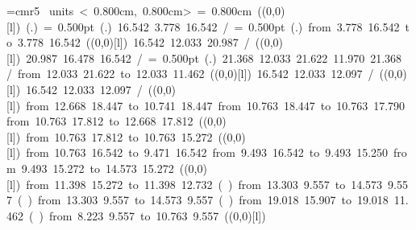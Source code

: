 \font\thinlinefont=cmr5
\mbox{\beginpicture
\setcoordinatesystem units < 0.800cm, 0.800cm>
\unitlength= 0.800cm
\linethickness=1pt
\setplotsymbol ({\makebox(0,0)[l]{\tencirc{}}})
\setshadesymbol ({\thinlinefont .})
\setlinear
%
%
\linethickness= 0.500pt
\setplotsymbol ({\thinlinefont .})
 16.542  3.778 16.542 /
%
%
\linethickness= 0.500pt
\setplotsymbol ({\thinlinefont .})
\putrule from  3.778 16.542 to  3.778 16.542
%
%
\linethickness=1pt
\setplotsymbol ({\makebox(0,0)[l]{\tencirc{}}})
 16.542 12.033 20.987 /
%
%
\linethickness=1pt
\setplotsymbol ({\makebox(0,0)[l]{\tencirc{}}})
 20.987 16.478 16.542 /
%
%
\linethickness= 0.500pt
\setplotsymbol ({\thinlinefont .})
%
%
 21.368 12.033 21.622 11.970 21.368 /
%
\putrule from 12.033 21.622 to 12.033 11.462
%
%
\linethickness=1pt
\setplotsymbol ({\makebox(0,0)[l]{\tencirc{}}})
 16.542 12.033 12.097 /
%
%
\linethickness=1pt
\setplotsymbol ({\makebox(0,0)[l]{\tencirc{}}})
 16.542 12.033 12.097 /
%
%
\linethickness=1pt
\setplotsymbol ({\makebox(0,0)[l]{\tencirc{}}})
\putrule from 12.668 18.447 to 10.741 18.447
\putrule from 10.763 18.447 to 10.763 17.790
\putrule from 10.763 17.812 to 12.668 17.812
%
%
\linethickness=1pt
\setplotsymbol ({\makebox(0,0)[l]{\tencirc{}}})
\putrule from 10.763 17.812 to 10.763 15.272
%
%
\linethickness=1pt
\setplotsymbol ({\makebox(0,0)[l]{\tencirc{}}})
\putrule from 10.763 16.542 to  9.471 16.542
\putrule from  9.493 16.542 to  9.493 15.250
\putrule from  9.493 15.272 to 14.573 15.272
%
%
\linethickness=1pt
\setplotsymbol ({\makebox(0,0)[l]{\tencirc{}}})
\putrule from 11.398 15.272 to 11.398 12.732
%
%
\linethickness=0pt
\setplotsymbol ({\thinlinefont \ })
\putrule from 13.303  9.557 to 14.573  9.557
%
%
\linethickness=0pt
\setplotsymbol ({\thinlinefont \ })
\putrule from 13.303  9.557 to 14.573  9.557
%
%
\linethickness=0pt
\setplotsymbol ({\thinlinefont \ })
\putrule from 19.018 15.907 to 19.018 11.462
%
%
\linethickness=0pt
\setplotsymbol ({\thinlinefont \ })
\putrule from  8.223  9.557 to 10.763  9.557
%
%
\linethickness=1pt
\setplotsymbol ({\makebox(0,0)[l]{\tencirc{}}})
}
